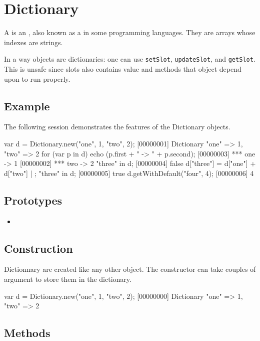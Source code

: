 \section{Dictionary}

A  is an , also known as a
 in some programming languages.  They are arrays whose
indexes are strings.

In a way objects are dictionaries: one can use \lstinline|setSlot|,
\lstinline|updateSlot|, and \lstinline|getSlot|.  This is unsafe since
slots also contains value and methods that object depend upon to run
properly.

\subsection{Example}

The following session demonstrates the features of the Dictionary
objects.

\begin{urbiscript}
var d = Dictionary.new("one", 1, "two", 2);
[00000001] Dictionary {"one" => 1, "two" => 2}
for (var p in d)
  echo (p.first + " -> " + p.second);
[00000003] *** one -> 1
[00000002] *** two -> 2
"three" in d;
[00000004] false
d["three"] = d["one"] + d["two"] | {};
"three" in d;
[00000005] true
d.getWithDefault("four", 4);
[00000006] 4
\end{urbiscript}


\subsection{Prototypes}

\begin{itemize}
\item {}
\end{itemize}

\subsection{Construction}

Dictionnary are created like any other object. The constructor can
take couples of argument to store them in the dictionary.

\begin{urbiscript}
var d = Dictionary.new("one", 1, "two", 2);
[00000000] Dictionary {"one" => 1, "two" => 2}
\end{urbiscript}

\subsection{Methods}


